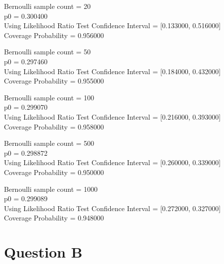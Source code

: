 \documentclass{article}
\begin{document}
Bernoulli sample count = 20\\
p0 = 0.300400\\
Using Likelihood Ratio Test Confidence Interval = [0.133000, 0.516000]\\
Coverage Probability = 0.956000

Bernoulli sample count = 50\\
p0 = 0.297460\\
Using Likelihood Ratio Test Confidence Interval = [0.184000, 0.432000]\\
Coverage Probability = 0.955000

Bernoulli sample count = 100\\
p0 = 0.299070\\
Using Likelihood Ratio Test Confidence Interval = [0.216000, 0.393000]\\
Coverage Probability = 0.958000

Bernoulli sample count = 500\\
p0 = 0.298872\\
Using Likelihood Ratio Test Confidence Interval = [0.260000, 0.339000]\\
Coverage Probability = 0.950000

Bernoulli sample count = 1000\\
p0 = 0.299089\\
Using Likelihood Ratio Test Confidence Interval = [0.272000, 0.327000]\\
Coverage Probability = 0.948000


\section{Question B}

\end{document}
